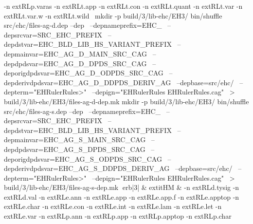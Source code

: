 -n 	extRL{p.varas}\hspace{.5em} 
-n 	extRL{t.app}\hspace{.5em} 
-n 	extRL{t.con}\hspace{.5em} 
-n 	extRL{t.quant}\hspace{.5em} 
-n 	extRL{t.var}\hspace{.5em} 
-n 	extRL{t.var.w}\hspace{.5em} 
-n 	extRL{t.wild}\hspace{.5em} 
\
mkdir -p build/3/lib-ehc/EH3/
bin/shuffle src/ehc/files-ag-d.dep --dep \
	  --depnameprefix=EHC_ \
	  --depsrcvar=SRC_EHC_PREFIX \
	  --depdstvar=EHC_BLD_LIB_HS_VARIANT_PREFIX \
	  --depmainvar=EHC_AG_D_MAIN_SRC_CAG \
	  --depdpdsvar=EHC_AG_D_DPDS_SRC_CAG \
	  --deporigdpdsvar=EHC_AG_D_ODPDS_SRC_CAG \
	  --depderivdpdsvar=EHC_AG_D_DDPDS_DERIV_AG \
	  --depbase=src/ehc/ \
	  --depterm="EHRulerRules>" \
	  --depign="EHRulerRules EHRulerRules.cag" \
	    > build/3/lib-ehc/EH3/files-ag-d-dep.mk
mkdir -p build/3/lib-ehc/EH3/
bin/shuffle src/ehc/files-ag-s.dep --dep \
	  --depnameprefix=EHC_ \
	  --depsrcvar=SRC_EHC_PREFIX \
	  --depdstvar=EHC_BLD_LIB_HS_VARIANT_PREFIX \
	  --depmainvar=EHC_AG_S_MAIN_SRC_CAG \
	  --depdpdsvar=EHC_AG_S_DPDS_SRC_CAG \
	  --deporigdpdsvar=EHC_AG_S_ODPDS_SRC_CAG \
	  --depderivdpdsvar=EHC_AG_S_DDPDS_DERIV_AG \
	  --depbase=src/ehc/ \
	  --depterm="EHRulerRules>" \
	  --depign="EHRulerRules EHRulerRules.cag" \
	    > build/3/lib-ehc/EH3/files-ag-s-dep.mk
erb|3| & 	extit{HM} & 
-n 	extRL{d.tysig}\hspace{.5em} 
-n 	extRL{d.val}\hspace{.5em} 
-n 	extRL{e.ann}\hspace{.5em} 
-n 	extRL{e.app}\hspace{.5em} 
-n 	extRL{e.app.f}\hspace{.5em} 
-n 	extRL{e.apptop}\hspace{.5em} 
-n 	extRL{e.char}\hspace{.5em} 
-n 	extRL{e.con}\hspace{.5em} 
-n 	extRL{e.int}\hspace{.5em} 
-n 	extRL{e.lam}\hspace{.5em} 
-n 	extRL{e.let}\hspace{.5em} 
-n 	extRL{e.var}\hspace{.5em} 
-n 	extRL{p.ann}\hspace{.5em} 
-n 	extRL{p.app}\hspace{.5em} 
-n 	extRL{p.apptop}\hspace{.5em} 
-n 	extRL{p.char}\hspace{.5em} 
